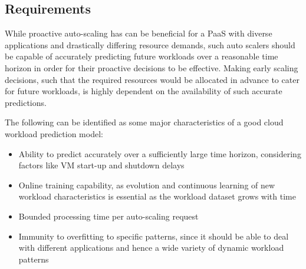 \subsection{Requirements}
While proactive auto-scaling has can be beneficial for a PaaS with diverse applications and drastically differing resource demands, such auto scalers should be capable of accurately predicting future workloads over a reasonable time horizon in order for their proactive decisions to be effective.
Making early scaling decisions, such that the required resources would be allocated in advance to cater for future workloads, is highly dependent on the availability of such accurate predictions.

The following can be identified as some major characteristics of a good cloud workload prediction model:

\begin{itemize}
\item Ability to predict accurately over a sufficiently large time horizon, considering factors like VM start-up and shutdown delays
\item Online training capability, as evolution and continuous learning of new workload characteristics is essential as the workload dataset grows with time
\item Bounded processing time per auto-scaling request
\item Immunity to overfitting to specific patterns, since it should be able to deal with different applications and hence a wide variety of dynamic workload patterns
\end{itemize}
